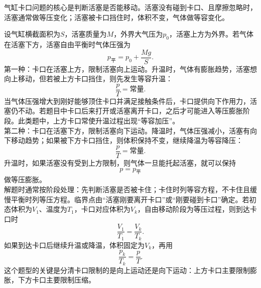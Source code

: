 \begin{casetypebox}[title={\strut\textcolor{white}{\bfseries 常见题型：气缸卡口问题}}]
气缸卡口问题的核心是判断活塞是否能移动。活塞没有碰到卡口、且摩擦忽略时，活塞通常做等压变化；活塞被卡口挡住时，体积不变，气体做等容变化。\\
\begin{center}
\end{center}
设气缸横截面积为$S$，活塞质量为$M$，外界大气压为$p_0$，活塞上方为外界。若气体在活塞下方，活塞自由平衡时气体压强为
\[
  p_{\text{平}}=p_0+\frac{Mg}{S}.
\]
第一种：卡口在活塞上方，限制活塞向上运动。升温时，气体有膨胀趋势，活塞想向上移动，但若被上方卡口挡住，则先发生等容升温：
\[
  \frac{p}{T}=\text{常量}.
\]
当气体压强增大到刚好能够顶住卡口并满足接触条件后，卡口提供向下作用力，活塞仍不动。若题目中卡口后来打开或活塞离开卡口，之后才可能进入等压膨胀阶段。此类题中，上方卡口常使升温过程出现“等容加压”。\\
第二种：卡口在活塞下方，限制活塞向下运动。降温时，气体压强减小，活塞有向下移动趋势；如果被下方卡口挡住，则体积保持不变，继续降温为等容降压：
\[
  \frac{p}{T}=\text{常量}.
\]
升温时，如果活塞没有受到上方限制，则气体一旦能托起活塞，就可以保持
\[
  p=p_{\text{平}}
\]
做等压膨胀。\\
解题时通常按阶段处理：先判断活塞是否被卡住；卡住时列等容方程，不卡住且缓慢平衡时列等压方程。临界点由“活塞刚要离开卡口”或“刚要碰到卡口”确定。若初态体积为$V_1$、温度为$T_1$，卡口对应体积为$V_k$，自由移动阶段为等压过程，则到达卡口时
\[
  \frac{V_1}{T_1}=\frac{V_k}{T_k}.
\]
如果到达卡口后继续升温或降温，体积固定为$V_k$，再用
\[
  \frac{p_k}{T_k}=\frac{p}{T}.
\]
这个题型的关键是分清卡口限制的是向上运动还是向下运动：上方卡口主要限制膨胀，下方卡口主要限制压缩。
\end{casetypebox}

